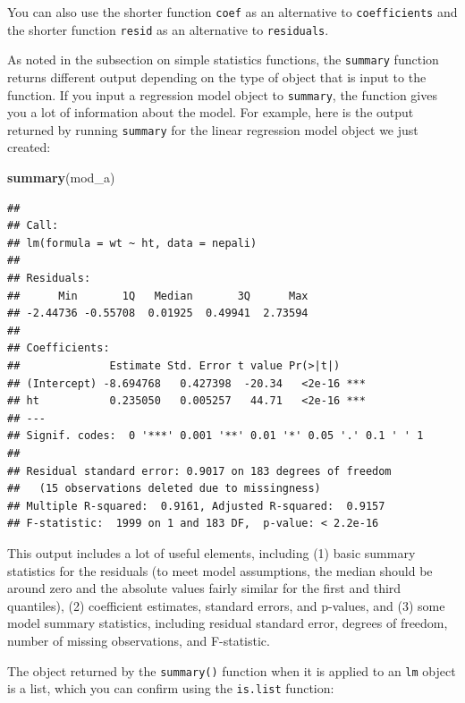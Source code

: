 \documentclass[]{book}
\makeatletter
\newenvironment{Shaded}{\begin{snugshade}}{\end{snugshade}}
\newcommand{\KeywordTok}[1]{\textcolor[rgb]{0.13,0.29,0.53}{\textbf{{#1}}}}
\newcommand{\NormalTok}[1]{{#1}}
\newenvironment{kframe}{%
\medskip{}
\setlength{\fboxsep}{.8em}
 \def\at@end@of@kframe{}%
 \ifinner\ifhmode%
  \def\at@end@of@kframe{\end{minipage}}%
  \begin{minipage}{\columnwidth}%
 \fi\fi%
 \def\FrameCommand##1{\hskip\@totalleftmargin \hskip-\fboxsep
 \colorbox{shadecolor}{##1}\hskip-\fboxsep
     \hskip-\linewidth \hskip-\@totalleftmargin \hskip\columnwidth}%
 \MakeFramed {\advance\hsize-\width
   \@totalleftmargin\z@ \linewidth\hsize
   \@setminipage}}%
 {\par\unskip\endMakeFramed%
 \at@end@of@kframe}
\renewenvironment{Shaded}{\begin{kframe}}{\end{kframe}}
\newenvironment{rmdblock}[1]
  {
  \begin{itemize}
  \renewcommand{\labelitemi}{
    \raisebox{-.7\height}[0pt][0pt]{
      {\setkeys{Gin}{width=3em,keepaspectratio}\texttt{[image: images/\#1]}}
    }
  }
  \setlength{\fboxsep}{1em}
  \begin{kframe}
  \item
  }
  {
  \end{kframe}
  \end{itemize}
  }
\newenvironment{rmdtip}
  {\begin{rmdblock}{tip}}
  {\end{rmdblock}}
\makeatother
\begin{document}
\begin{rmdtip}
You can also use the shorter function \texttt{coef} as an alternative to
\texttt{coefficients} and the shorter function \texttt{resid} as an
alternative to \texttt{residuals}.
\end{rmdtip}

As noted in the subsection on simple statistics functions, the
\texttt{summary} function returns different output depending on the type
of object that is input to the function. If you input a regression model
object to \texttt{summary}, the function gives you a lot of information
about the model. For example, here is the output returned by running
\texttt{summary} for the linear regression model object we just created:

\begin{Shaded}
\begin{Highlighting}[]
\KeywordTok{summary}\NormalTok{(mod_a)}
\end{Highlighting}
\end{Shaded}

\begin{verbatim}
## 
## Call:
## lm(formula = wt ~ ht, data = nepali)
## 
## Residuals:
##      Min       1Q   Median       3Q      Max 
## -2.44736 -0.55708  0.01925  0.49941  2.73594 
## 
## Coefficients:
##              Estimate Std. Error t value Pr(>|t|)    
## (Intercept) -8.694768   0.427398  -20.34   <2e-16 ***
## ht           0.235050   0.005257   44.71   <2e-16 ***
## ---
## Signif. codes:  0 '***' 0.001 '**' 0.01 '*' 0.05 '.' 0.1 ' ' 1
## 
## Residual standard error: 0.9017 on 183 degrees of freedom
##   (15 observations deleted due to missingness)
## Multiple R-squared:  0.9161, Adjusted R-squared:  0.9157 
## F-statistic:  1999 on 1 and 183 DF,  p-value: < 2.2e-16
\end{verbatim}

This output includes a lot of useful elements, including (1) basic
summary statistics for the residuals (to meet model assumptions, the
median should be around zero and the absolute values fairly similar for
the first and third quantiles), (2) coefficient estimates, standard
errors, and p-values, and (3) some model summary statistics, including
residual standard error, degrees of freedom, number of missing
observations, and F-statistic.

The object returned by the \texttt{summary()} function when it is
applied to an \texttt{lm} object is a list, which you can confirm using
the \texttt{is.list} function:
\end{document}
